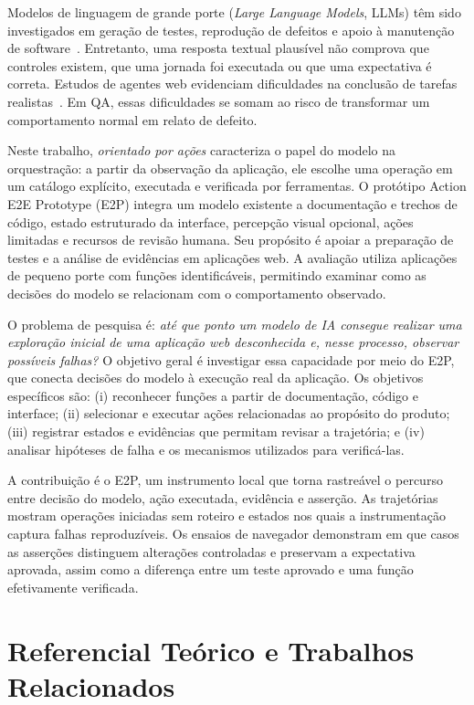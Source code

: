 \documentclass[12pt]{article}
\begin{document}
Modelos de linguagem de grande porte (\textit{Large Language Models}, LLMs) têm sido investigados em geração de testes, reprodução de defeitos e apoio à manutenção de software~\cite{wang2024survey,kang2023libro}. Entretanto, uma resposta textual plausível não comprova que controles existem, que uma jornada foi executada ou que uma expectativa é correta. Estudos de agentes web evidenciam dificuldades na conclusão de tarefas realistas~\cite{zhou2024webarena,drouin2024workarena}. Em QA, essas dificuldades se somam ao risco de transformar um comportamento normal em relato de defeito.

Neste trabalho, \textit{orientado por ações} caracteriza o papel do modelo na orquestração: a partir da observação da aplicação, ele escolhe uma operação em um catálogo explícito, executada e verificada por ferramentas. O protótipo Action E2E Prototype (E2P) integra um modelo existente a documentação e trechos de código, estado estruturado da interface, percepção visual opcional, ações limitadas e recursos de revisão humana. Seu propósito é apoiar a preparação de testes e a análise de evidências em aplicações web. A avaliação utiliza aplicações de pequeno porte com funções identificáveis, permitindo examinar como as decisões do modelo se relacionam com o comportamento observado.

O problema de pesquisa é: \textit{até que ponto um modelo de IA consegue realizar uma exploração inicial de uma aplicação web desconhecida e, nesse processo, observar possíveis falhas?} O objetivo geral é investigar essa capacidade por meio do E2P, que conecta decisões do modelo à execução real da aplicação. Os objetivos específicos são: (i) reconhecer funções a partir de documentação, código e interface; (ii) selecionar e executar ações relacionadas ao propósito do produto; (iii) registrar estados e evidências que permitam revisar a trajetória; e (iv) analisar hipóteses de falha e os mecanismos utilizados para verificá-las.

A contribuição é o E2P, um instrumento local que torna rastreável o percurso entre decisão do modelo, ação executada, evidência e asserção. As trajetórias mostram operações iniciadas sem roteiro e estados nos quais a instrumentação captura falhas reproduzíveis. Os ensaios de navegador demonstram em que casos as asserções distinguem alterações controladas e preservam a expectativa aprovada, assim como a diferença entre um teste aprovado e uma função efetivamente verificada.

\section{Referencial Teórico e Trabalhos Relacionados}\label{sec:related}
\end{document}
